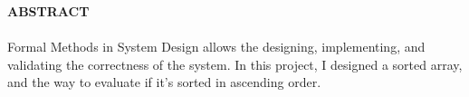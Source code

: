 \begin{center}
\thispagestyle{empty}
\vspace{2cm}
\LARGE{\textbf{ABSTRACT}}\\[1.0cm]
\end{center}
\thispagestyle{empty}
\large{\paragraph{}
Formal Methods in System Design allows the designing, implementing, and validating the correctness of the system. In this project, I designed a sorted array, and the way to evaluate if it's sorted in ascending order. 
}